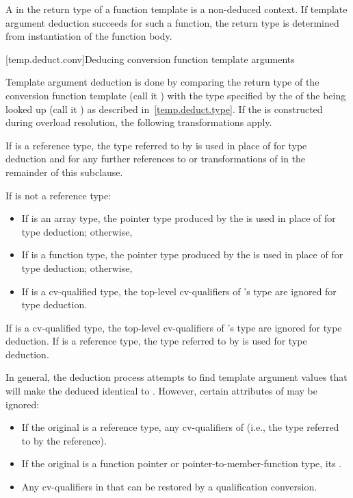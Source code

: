 \pnum
A  in the return type of a
function template is a non-deduced context. If template argument
deduction succeeds for such a function, the return type is determined
from instantiation of the function body.

[temp.deduct.conv]{Deducing conversion function template arguments}

\pnum
Template argument deduction is done by comparing the return type of
the
conversion function template
(call it
)
with the type specified by the  of the
 being looked up
(call it ) as described in~\ref{temp.deduct.type}.
If the  is constructed during
overload resolution,
the following transformations apply.

\pnum
If  is a reference type, the type referred to by  is used in place
of  for type deduction and for any further references to or transformations of
 in the remainder of this subclause.

\pnum
If
is not a reference type:
\begin{itemize}
\item
If
is an array type, the pointer type produced by the
 is used in place of
for type
deduction; otherwise,
\item
If
is a function type, the pointer type produced by the
 is used in place of
for
type deduction; otherwise,
\item
If
is a cv-qualified type, the top-level cv-qualifiers of
's
type are ignored for type deduction.
\end{itemize}

\pnum
If
is a cv-qualified type, the top-level cv-qualifiers of
's
type are ignored for type deduction.
If
is a
reference type, the type referred to by
is used for type deduction.

\pnum
In general, the deduction process attempts to find template argument
values that will make the deduced
identical to
.
However, certain attributes of  may be ignored:
\begin{itemize}
\item
If the original  is a reference type,
any cv-qualifiers of 
(i.e., the type referred to by the reference).
\item
If the original  is
a function pointer or pointer-to-member-function type,
its .
\item
Any cv-qualifiers in 
that can be restored by a qualification conversion.
\end{itemize}

